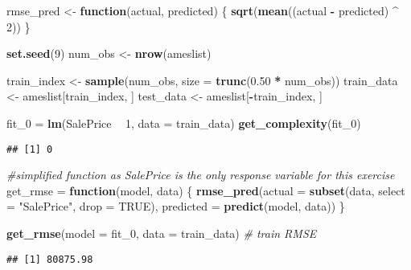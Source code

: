 \documentclass[]{article}
\newenvironment{Shaded}{\begin{snugshade}}{\end{snugshade}}
\newcommand{\CommentTok}[1]{\textcolor[rgb]{0.56,0.35,0.01}{\textit{#1}}}
\newcommand{\ControlFlowTok}[1]{\textcolor[rgb]{0.13,0.29,0.53}{\textbf{#1}}}
\newcommand{\DataTypeTok}[1]{\textcolor[rgb]{0.13,0.29,0.53}{#1}}
\newcommand{\DecValTok}[1]{\textcolor[rgb]{0.00,0.00,0.81}{#1}}
\newcommand{\FloatTok}[1]{\textcolor[rgb]{0.00,0.00,0.81}{#1}}
\newcommand{\KeywordTok}[1]{\textcolor[rgb]{0.13,0.29,0.53}{\textbf{#1}}}
\newcommand{\NormalTok}[1]{#1}
\newcommand{\OperatorTok}[1]{\textcolor[rgb]{0.81,0.36,0.00}{\textbf{#1}}}
\newcommand{\OtherTok}[1]{\textcolor[rgb]{0.56,0.35,0.01}{#1}}
\newcommand{\StringTok}[1]{\textcolor[rgb]{0.31,0.60,0.02}{#1}}
\begin{document}
\begin{Shaded}
\begin{Highlighting}[]
\NormalTok{rmse_pred <-}\StringTok{ }\ControlFlowTok{function}\NormalTok{(actual, predicted) \{}
  \KeywordTok{sqrt}\NormalTok{(}\KeywordTok{mean}\NormalTok{((actual }\OperatorTok{-}\StringTok{ }\NormalTok{predicted) }\OperatorTok{^}\StringTok{ }\DecValTok{2}\NormalTok{))}
\NormalTok{\}}

\KeywordTok{set.seed}\NormalTok{(}\DecValTok{9}\NormalTok{)}
\NormalTok{num_obs <-}\StringTok{ }\KeywordTok{nrow}\NormalTok{(ameslist)}

\NormalTok{train_index <-}\StringTok{ }\KeywordTok{sample}\NormalTok{(num_obs, }\DataTypeTok{size =} \KeywordTok{trunc}\NormalTok{(}\FloatTok{0.50} \OperatorTok{*}\StringTok{ }\NormalTok{num_obs))}
\NormalTok{train_data <-}\StringTok{ }\NormalTok{ameslist[train_index, ]}
\NormalTok{test_data <-}\StringTok{ }\NormalTok{ameslist[}\OperatorTok{-}\NormalTok{train_index, ]}

\NormalTok{fit_}\DecValTok{0}\NormalTok{ =}\StringTok{ }\KeywordTok{lm}\NormalTok{(SalePrice }\OperatorTok{~}\StringTok{ }\DecValTok{1}\NormalTok{, }\DataTypeTok{data =}\NormalTok{ train_data)}
\KeywordTok{get_complexity}\NormalTok{(fit_}\DecValTok{0}\NormalTok{)}
\end{Highlighting}
\end{Shaded}

\begin{verbatim}
## [1] 0
\end{verbatim}

\begin{Shaded}
\begin{Highlighting}[]
\CommentTok{#simplified function as SalePrice is the only response variable for this exercise}
\NormalTok{get_rmse =}\StringTok{ }\ControlFlowTok{function}\NormalTok{(model, data) \{}
  \KeywordTok{rmse_pred}\NormalTok{(}\DataTypeTok{actual =} \KeywordTok{subset}\NormalTok{(data, }\DataTypeTok{select =} \StringTok{"SalePrice"}\NormalTok{, }\DataTypeTok{drop =} \OtherTok{TRUE}\NormalTok{),}
       \DataTypeTok{predicted =} \KeywordTok{predict}\NormalTok{(model, data))}
\NormalTok{\}}

\KeywordTok{get_rmse}\NormalTok{(}\DataTypeTok{model =}\NormalTok{ fit_}\DecValTok{0}\NormalTok{, }\DataTypeTok{data =}\NormalTok{ train_data) }\CommentTok{# train RMSE}
\end{Highlighting}
\end{Shaded}

\begin{verbatim}
## [1] 80875.98
\end{verbatim}
\end{document}
